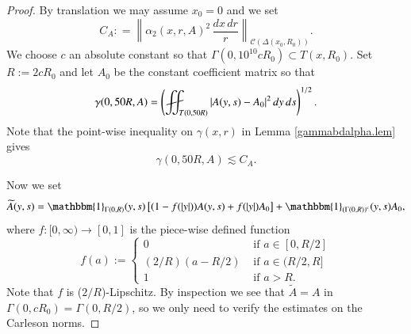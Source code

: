\documentclass[11pt, a4paper,leqno]{amsart}
\def\Yint#1{\mathchoice
    {\YYint\displaystyle\textstyle{#1}}%
    {\YYint\textstyle\scriptstyle{#1}}%
    {\YYint\scriptstyle\scriptscriptstyle{#1}}%
    {\YYint\scriptscriptstyle\scriptscriptstyle{#1}}%
      \!\iint}
\def\YYint#1#2#3{{\setbox0=\hbox{$#1{#2#3}{\iint}$}
    \vcenter{\hbox{$#2#3$}}\kern-.51\wd0}}
\def\longdash{{-}\mkern-3.5mu{-}}
\def\tiltlongdash{\rotatebox[origin=c]{15}{$\longdash$}}
\def\fiint{\Yint\tiltlongdash}
\theoremstyle{plain}
\theoremstyle{definition}
\theoremstyle{remark}
\numberwithin{equation}{section}
\def\Yint#1{\mathchoice
    {\YYint\displaystyle\textstyle{#1}}%
    {\YYint\textstyle\scriptstyle{#1}}%
    {\YYint\scriptstyle\scriptscriptstyle{#1}}%
    {\YYint\scriptscriptstyle\scriptscriptstyle{#1}}%
      \!\iint}
\def\YYint#1#2#3{{\setbox0=\hbox{$#1{#2#3}{\iint}$}
    \vcenter{\hbox{$#2#3$}}\kern-.51\wd0}}
\def\longdash{{-}\mkern-3.5mu{--}}
\def\tiltlongdash{\rotatebox[origin=c]{15}{$\longdash$}}
\def\fiint{\Yint\tiltlongdash}
\begin{document}
\begin{proof}
By translation we may assume $x_0 = 0$ and we set \[C_A: = \left\| \alpha_2(x,r,A)^2 \, \frac{dx \, dr}{r}\right\|_{\mathcal{C}(\Delta(x_0,R_0))}.\] We choose $c$ an absolute constant so that $\Gamma(0, 10^{10}cR_0) \subset T(x,R_0)$. Set $R := 2cR_0$ and let $A_0$ be the constant coefficient matrix so that
\[\gamma(0,50R,A) = \left(\fiint_{T(0,50R)} |A(y,s) - A_0|^2 \, dy \, ds\right)^{1/2}. \]
Note that the point-wise inequality on $\gamma(x,r)$ in Lemma \ref{gammabdalpha.lem} gives
\begin{equation}\label{gammaptws.eq}
\gamma(0,50R,A) \lesssim C_A.
\end{equation}

Now we set
\[\widetilde{A}(y,s) = \mathbbm{1}_{\Gamma(0,R)}(y,s) \left[(1- f(|y|))A(y,s) + f(|y|)A_0 \right] +\mathbbm{1}_{\left(\Gamma(0,R)\right)^c}(y,s)  
A_0,\]
where $f:[0,\infty) \to [0,1]$ is the piece-wise defined function
\begin{equation}\label{def:f}
	f(a) := \begin{cases}
0 & \text{ if } a \in [0,R/2] \\
(2/R)(a - R/2) & \text{ if } a \in (R/2,R] \\
1 & \text{ if } a > R.
\end{cases}
\end{equation} 
Note that $f$ is ($2/R$)-Lipschitz. By inspection we see that $\widetilde{A} = A$ in $\Gamma(0,cR_0) = \Gamma(0, R/2)$, so we only need to verify the estimates on the Carleson norms. 


\end{proof}
\end{document}
